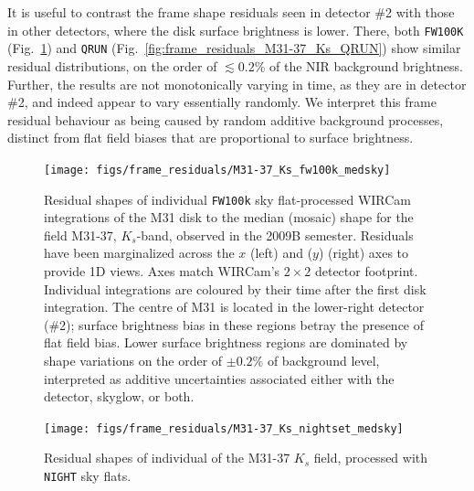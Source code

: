 \documentclass[iop]{emulateapj}
\newcommand{\Fig}[1]{Fig.~\ref{fig:#1}}  %
\begin{document}
It is useful to contrast the frame shape residuals seen in detector \#2 with those in other detectors, where the disk surface brightness is lower.
There, both \texttt{FW100K} (\Fig{frame_residuals_M31-37_Ks_fw100k_medsky}) and \texttt{QRUN} (\Fig{frame_residuals_M31-37_Ks_QRUN}) show similar residual distributions, on the order of $\lesssim 0.2$\% of the NIR background brightness.
Further, the results are not monotonically varying in time, as they are in detector \#2, and indeed appear to vary essentially randomly.
We interpret this frame residual behaviour as being caused by random additive background processes, distinct from flat field biases that are proportional to surface brightness.

\begin{figure}[p]
\centering
\texttt{[image: figs/frame\_residuals/M31-37\_Ks\_fw100k\_medsky]}
\caption{Residual shapes of individual \texttt{FW100k} sky flat-processed WIRCam integrations of the M31 disk to the median (mosaic) shape for the field M31-37, $K_s$-band, observed in the 2009B semester.
Residuals have been marginalized across the $x$ (left) and ($y$) (right) axes to provide 1D views.
Axes match WIRCam's $2\times2$ detector footprint.
Individual integrations are coloured by their time after the first disk integration.
The centre of M31 is located in the lower-right detector (\#2); surface brightness bias in these regions betray the presence of flat field bias. Lower surface brightness regions are dominated by shape variations on the order of $\pm 0.2\%$ of background level, interpreted as additive uncertainties associated either with the detector, skyglow, or both.}
\label{fig:frame_residuals_M31-37_Ks_fw100k_medsky}
\end{figure}

\begin{figure}[p]
\centering
\texttt{[image: figs/frame\_residuals/M31-37\_Ks\_nightset\_medsky]}
\caption{Residual shapes of individual of the M31-37 $K_s$ field, processed with \texttt{NIGHT} sky flats.
}
\label{fig:frame_residuals_M31-37_Ks_nightset}
\end{figure}
\end{document}
